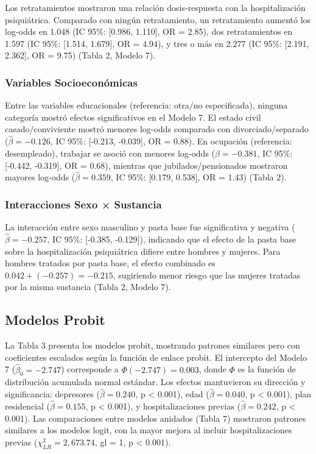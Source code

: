 \documentclass[
  spanish,
  10pt,
]{article}
\begin{document}
Los retratamientos mostraron una relación dosis-respuesta con la
hospitalización psiquiátrica. Comparado con ningún retratamiento, un
retratamiento aumentó los log-odds en 1.048 (IC 95\%: {[}0.986,
1.110{]}, OR = 2.85), dos retratamientos en 1.597 (IC 95\%: {[}1.514,
1.679{]}, OR = 4.94), y tres o más en 2.277 (IC 95\%: {[}2.191,
2.362{]}, OR = 9.75) (Tabla 2, Modelo 7).

\subsubsection{Variables
Socioeconómicas}\label{variables-socioeconuxf3micas}

Entre las variables educacionales (referencia: otra/no especificada),
ninguna categoría mostró efectos significativos en el Modelo 7. El
estado civil casado/conviviente mostró menores log-odds comparado con
divorciado/separado (\(\hat{\beta} = -0.126\), IC 95\%: {[}-0.213,
-0.039{]}, OR = 0.88). En ocupación (referencia: desempleado), trabajar
se asoció con menores log-odds (\(\hat{\beta} = -0.381\), IC 95\%:
{[}-0.442, -0.319{]}, OR = 0.68), mientras que jubilados/pensionados
mostraron mayores log-odds (\(\hat{\beta} = 0.359\), IC 95\%: {[}0.179,
0.538{]}, OR = 1.43) (Tabla 2).

\subsubsection{Interacciones Sexo ×
Sustancia}\label{interacciones-sexo-sustancia}

La interacción entre sexo masculino y pasta base fue significativa y
negativa (\(\hat{\beta} = -0.257\), IC 95\%: {[}-0.385, -0.129{]}),
indicando que el efecto de la pasta base sobre la hospitalización
psiquiátrica difiere entre hombres y mujeres. Para hombres tratados por
pasta base, el efecto combinado es \(0.042 + (-0.257) = -0.215\),
sugiriendo menor riesgo que las mujeres tratadas por la misma sustancia
(Tabla 2, Modelo 7).

\subsection{Modelos Probit}\label{modelos-probit}

La Tabla 3 presenta los modelos probit, mostrando patrones similares
pero con coeficientes escalados según la función de enlace probit. El
intercepto del Modelo 7 (\(\hat{\beta}_0 = -2.747\)) corresponde a
\(\Phi(-2.747) = 0.003\), donde \(\Phi\) es la función de distribución
acumulada normal estándar. Los efectos mantuvieron su dirección y
significancia: depresores (\(\hat{\beta} = 0.240\), p \textless{}
0.001), edad (\(\hat{\beta} = 0.040\), p \textless{} 0.001), plan
residencial (\(\hat{\beta} = 0.155\), p \textless{} 0.001), y
hospitalizaciones previas (\(\hat{\beta} = 0.242\), p \textless{}
0.001). Las comparaciones entre modelos anidados (Tabla 7) mostraron
patrones similares a los modelos logit, con la mayor mejora al incluir
hospitalizaciones previas (\(\chi^2_{LR} = 2,673.74\), gl = 1, p
\textless{} 0.001).
\end{document}
